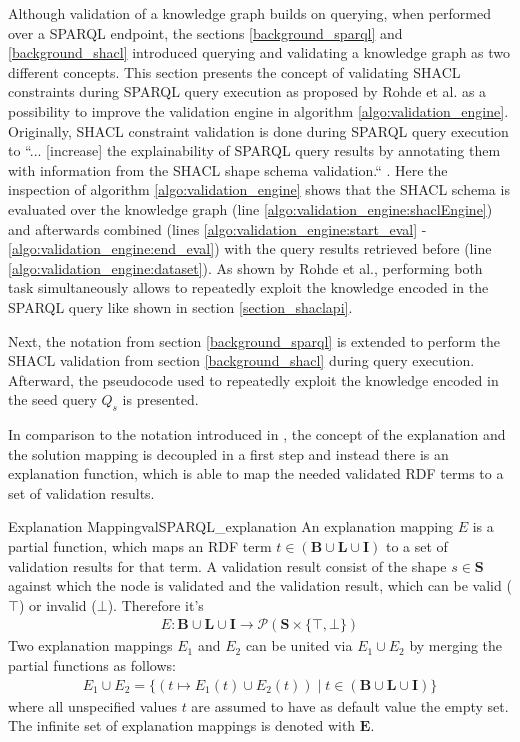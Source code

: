 
    Although validation of a knowledge graph builds on querying, when performed over a SPARQL endpoint, the sections \ref{background_sparql} and \ref{background_shacl} introduced querying and validating a knowledge graph as two different concepts. This section presents the concept of validating SHACL constraints during SPARQL query execution as proposed by Rohde et al. \cite{valSPARQL} as a possibility to improve the validation engine in algorithm \ref{algo:validation_engine}.
    Originally, SHACL constraint validation is done during SPARQL query execution to ``... [increase] the explainability of SPARQL query results by annotating them with information from the SHACL shape schema validation.`` \cite{valSPARQL}.
    Here the inspection of algorithm \ref{algo:validation_engine} shows that the SHACL schema is evaluated over the knowledge graph (line \ref{algo:validation_engine:shaclEngine}) and afterwards combined (lines \ref{algo:validation_engine:start_eval} - \ref{algo:validation_engine:end_eval}) with the query results retrieved before (line \ref{algo:validation_engine:dataset}).
    As shown by Rohde et al., performing both task simultaneously allows to repeatedly exploit the knowledge encoded in the SPARQL query like shown in section \ref{section_shaclapi}.
    
    Next, the notation from section \ref{background_sparql} is extended to perform the SHACL validation from section \ref{background_shacl} during query execution. Afterward, the pseudocode used to repeatedly exploit the knowledge encoded in the seed query $Q_s$ is presented.
    
    In comparison to the notation introduced in \cite{valSPARQL}, the concept of the explanation and the solution mapping is decoupled in a first step and instead there is an explanation function, which is able to map the needed validated RDF terms to a set of validation results. 
    
    \begin{Def}{Explanation Mapping}{valSPARQL_explanation} 
        An explanation mapping $E$ is a partial function, which maps an RDF term $t \in (\mathbf{B} \cup \mathbf{L} \cup \mathbf{I})$ to a set of validation results for that term. A validation result consist of the shape $s \in \mathbf{S}$ against which the node is validated and the validation result, which can be valid ($\top$) or invalid ($\bot$). Therefore it's
        \begin{gather*}
            E: \mathbf{B} \cup \mathbf{L} \cup \mathbf{I} \to \mathcal{P}(\mathbf{S} \times \{\top, \bot\})
        \end{gather*}
        Two explanation mappings $E_1$ and $E_2$ can be united via $E_1 \cup E_2$ by merging the partial functions as follows:
        \begin{gather*}
            E_1 \cup E_2 = \{(t \mapsto E_1(t) \cup E_2(t)) \mid t \in (\mathbf{B} \cup \mathbf{L} \cup \mathbf{I})\}
        \end{gather*}
        where all unspecified values $t$ are assumed to have as default value the empty set.
        The infinite set of explanation mappings is denoted with $\mathbf{E}$.
    \end{Def}
    
